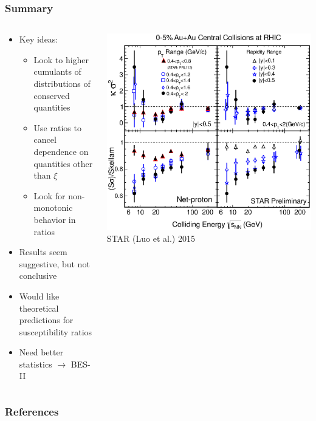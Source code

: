\documentclass[accentcolor=tud2c,usenames,dvipsnames,colorbacktitle,inverttitle,landscape,german,presentation,t]{tudbeamer}
\begin{document}
  \begin{frame}
    \frametitle{Summary}
    \begin{columns}[c]
      \begin{column}{0.6\textwidth}
        \begin{itemize}
          \item Key ideas:
          \begin{itemize}
            \item Look to higher cumulants of distributions of conserved
              quantities
            \item Use ratios to cancel dependence on quantities other than
              $\xi$
            \item Look for non-monotonic behavior in ratios
          \end{itemize}
          \item Results seem suggestive, but not conclusive
          \item Would like theoretical predictions for susceptibility ratios
          \item Need better statistics $\rightarrow$ BES-II
        \end{itemize}
      \end{column}
      \begin{column}{0.4\textwidth}
        \begin{center}
          \includegraphics[width=\textwidth]{figures/14/PT_Y_Energy}
          \\\footnotesize{STAR (Luo et al.) 2015}
        \end{center}
      \end{column}
    \end{columns}
  \end{frame}


  \begin{frame}[allowframebreaks]
    \frametitle{References}
    
    
  \end{frame}
\end{document}
